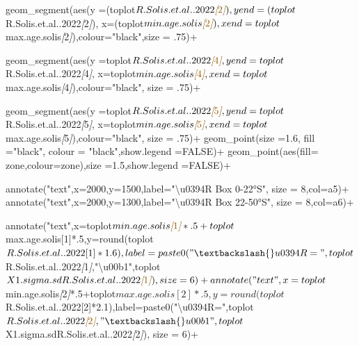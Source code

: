 \documentclass[
]{article}
\newenvironment{Shaded}{\begin{snugshade}}{\end{snugshade}}
\newcommand{\CommentTok}[1]{\textcolor[rgb]{0.56,0.35,0.01}{\textit{#1}}}
\newcommand{\NormalTok}[1]{#1}
\newcommand{\OtherTok}[1]{\textcolor[rgb]{0.56,0.35,0.01}{#1}}
\begin{document}
\begin{Shaded}
\begin{Highlighting}[]
\NormalTok{  geom\_segment(aes(y =(toplot$R.Solis.et.al..2022}\CommentTok{[}\OtherTok{2}\CommentTok{]}\NormalTok{),}
\NormalTok{                   yend =(toplot$R.Solis.et.al..2022}\CommentTok{[}\OtherTok{2}\CommentTok{]}\NormalTok{),}
\NormalTok{                   x=(toplot$min.age.solis}\CommentTok{[}\OtherTok{2}\CommentTok{]}\NormalTok{),}
\NormalTok{                   xend=toplot$max.age.solis}\CommentTok{[}\OtherTok{2}\CommentTok{]}\NormalTok{),colour="black",size = .75)+}
  
\NormalTok{  geom\_segment(aes(y =toplot$R.Solis.et.al..2022}\CommentTok{[}\OtherTok{4}\CommentTok{]}\NormalTok{,}
\NormalTok{                   yend =toplot$R.Solis.et.al..2022}\CommentTok{[}\OtherTok{4}\CommentTok{]}\NormalTok{,}
\NormalTok{                   x=toplot$min.age.solis}\CommentTok{[}\OtherTok{4}\CommentTok{]}\NormalTok{,}
\NormalTok{                   xend=toplot$max.age.solis}\CommentTok{[}\OtherTok{4}\CommentTok{]}\NormalTok{),colour="black", size = .75)+}
  
\NormalTok{  geom\_segment(aes(y =toplot$R.Solis.et.al..2022}\CommentTok{[}\OtherTok{5}\CommentTok{]}\NormalTok{,}
\NormalTok{                   yend =toplot$R.Solis.et.al..2022}\CommentTok{[}\OtherTok{5}\CommentTok{]}\NormalTok{,}
\NormalTok{                   x=toplot$min.age.solis}\CommentTok{[}\OtherTok{5}\CommentTok{]}\NormalTok{,}
\NormalTok{                   xend=toplot$max.age.solis}\CommentTok{[}\OtherTok{5}\CommentTok{]}\NormalTok{),colour="black", size = .75)+}
\NormalTok{  geom\_point(size =1.6, fill ="black", colour = "black",show.legend =FALSE)+}
\NormalTok{  geom\_point(aes(fill= zone,colour=zone),size =1.5,show.legend =FALSE)+}
 
\NormalTok{  annotate("text",x=2000,y=1500,label="\textbackslash{}u0394R Box  0{-}22°S", size = 8,col=a5)+}
\NormalTok{  annotate("text",x=2000,y=1300,label="\textbackslash{}u0394R Box 22{-}50°S", size = 8,col=a6)+}
  
\NormalTok{  annotate("text",x=toplot$min.age.solis}\CommentTok{[}\OtherTok{1}\CommentTok{]}\NormalTok{*.5+toplot$max.age.solis[1]*.5,y=round(toplot$R.Solis.et.al..2022[1]*1.6),label=paste0("\textbackslash{}u0394R=",toplot$R.Solis.et.al..2022}\CommentTok{[}\OtherTok{1}\CommentTok{]}\NormalTok{,"\textbackslash{}u00b1",toplot$X1.sigma.sdR.Solis.et.al..2022}\CommentTok{[}\OtherTok{1}\CommentTok{]}\NormalTok{), size = 6)+}
\NormalTok{  annotate("text",x=toplot$min.age.solis}\CommentTok{[}\OtherTok{2}\CommentTok{]}\NormalTok{*.5+toplot$max.age.solis[2]*.5,y=round(toplot$R.Solis.et.al..2022[2]*2.1),label=paste0("\textbackslash{}u0394R=",toplot$R.Solis.et.al..2022}\CommentTok{[}\OtherTok{2}\CommentTok{]}\NormalTok{,"\textbackslash{}u00b1",toplot$X1.sigma.sdR.Solis.et.al..2022}\CommentTok{[}\OtherTok{2}\CommentTok{]}\NormalTok{), size = 6)+}
  

\end{Highlighting}
\end{Shaded}
\end{document}
